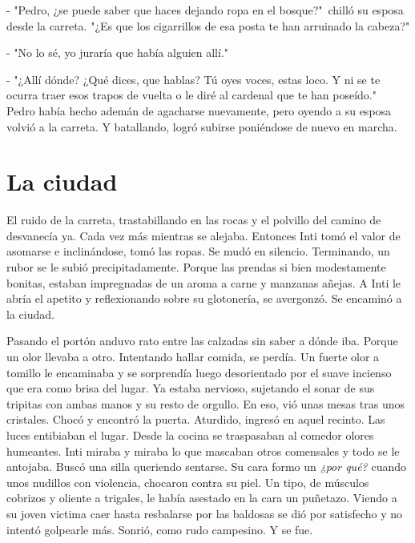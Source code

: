 - "Pedro, ¿se puede saber que haces dejando ropa en el bosque?"\, chilló su esposa desde la carreta. "¿Es que los cigarrillos de esa posta te han arruinado la cabeza?"

- "No lo sé, yo juraría que había alguien allí."

- "¿Allí dónde? ¿Qué dices, que hablas? Tú oyes voces, estas loco. Y ni se te ocurra traer esos trapos de vuelta o le diré al cardenal que te han poseído."\, Pedro había hecho ademán de agacharse nuevamente, pero oyendo a su esposa volvió a la carreta. Y batallando, logró subirse poniéndose de nuevo en marcha.



\chapter{La ciudad}
El ruido de la carreta, trastabillando en las rocas y el polvillo del camino de desvanecía ya. Cada vez más mientras se alejaba. Entonces Inti tomó el valor de asomarse e inclinándose, tomó las ropas. Se mudó en silencio. Terminando, un rubor se le subió precipitadamente. Porque las prendas si bien modestamente bonitas, estaban impregnadas de un aroma a carne y manzanas añejas. A Inti le abría el apetito y reflexionando sobre su glotonería, se avergonzó. Se encaminó a la ciudad.

Pasando el portón anduvo rato entre las calzadas sin saber a dónde iba. Porque un olor llevaba a otro. Intentando hallar comida, se perdía. Un fuerte olor a tomillo le encaminaba y se sorprendía luego desorientado por el suave incienso que era como brisa del lugar. Ya estaba nervioso, sujetando el sonar de sus tripitas con ambas manos y su resto de orgullo. En eso, vió unas mesas tras unos cristales. Chocó y encontró la puerta. Aturdido, ingresó en aquel recinto. Las luces entibiaban el lugar. Desde la cocina se traspasaban al comedor olores humeantes. Inti miraba y miraba lo que mascaban otros comensales y todo se le antojaba. Buscó una silla queriendo sentarse. Su cara formo un \emph{¿por qué?} cuando unos nudillos con violencia, chocaron contra su piel. Un tipo, de músculos cobrizos y oliente a trigales, le había asestado en la cara un puñetazo. Viendo a su joven victima caer hasta resbalarse por las baldosas se dió por satisfecho y no intentó golpearle más. Sonrió, como rudo campesino. Y se fue.

